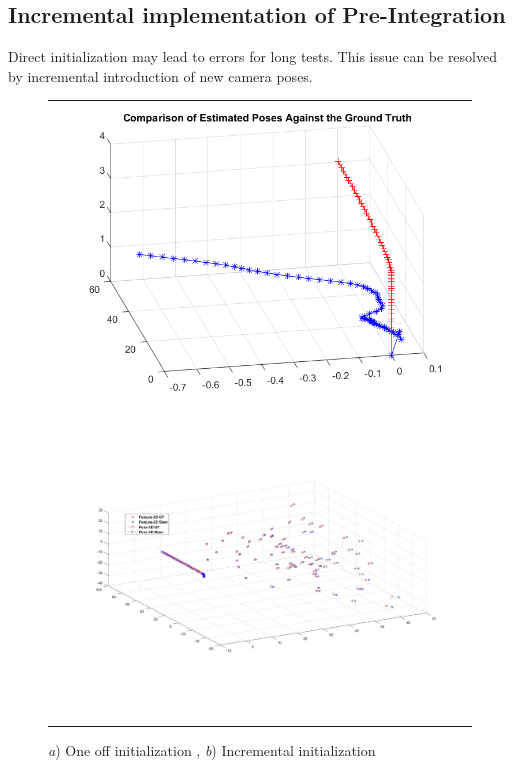 \documentclass[12pt]{article}   %
\begin{document}
\subsection{Incremental implementation of Pre-Integration}
Direct initialization may lead to errors for long tests. This issue can be resolved by incremental introduction of new camera poses. 

	\begin{figure}[!ht]
		\begin{center}\begin{tabular}{c}
				\includegraphics[height=8cm]{figures/simuNpose_error.png}\\
				\includegraphics[height=8cm]{Figures/Final_pose-feature_3D_GT-vs-SLAM.jpg}\\				
			\end{tabular}\end{center}
			\caption{\emph{a}) One off initialization , \emph{b}) Incremental initialization } 
			\label{fig:VIN sensor information}
		\end{figure} 
\end{document}
